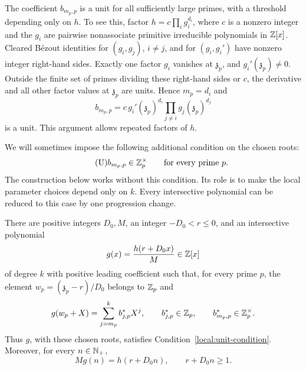 The coefficient \(b_{m_p,p}\) is a unit for all sufficiently large primes,
with a threshold depending only on \(h\). To see this, factor
\(h=c\prod_i g_i^{d_i}\), where \(c\) is a nonzero integer and the \(g_i\)
are pairwise nonassociate primitive irreducible polynomials in \(\mathbb Z[x]\). Cleared
B\'ezout identities for \((g_i,g_j)\), \(i\ne j\), and for \((g_i,g_i')\)
have nonzero integer right-hand sides. Exactly one factor \(g_i\) vanishes
at \(\mathfrak z_p\), and \(g_i'(\mathfrak z_p)\ne0\). Outside the finite
set of primes dividing these right-hand sides or \(c\), the derivative and
all other factor values at \(\mathfrak z_p\) are units. Hence \(m_p=d_i\)
and
\[
 b_{m_p,p}
 =c\,g_i'(\mathfrak z_p)^{d_i}
       \prod_{j\ne i}g_j(\mathfrak z_p)^{d_j}
\]
is a unit. This argument allows repeated factors of \(h\).

We will sometimes impose the following additional condition on the chosen
roots:
\begin{equation*}\tag{U}\label{local:unit-condition}
 b_{m_p,p}\in\mathbb Z_p^\times\qquad\text{for every prime }p.
\end{equation*}
The construction below works without this condition. Its role is to make the
local parameter choices depend only on \(k\). Every intersective polynomial
can be reduced to this case by one progression change.

\begin{lemma}\label{local:normalization}
There are positive integers \(D_0,M\), an integer \(-D_0<r\le0\), and an
intersective polynomial
\[
 g(x)=\frac{h(r+D_0x)}{M}\in\mathbb Z[x]
\]
of degree \(k\) with positive leading coefficient such that, for every prime
\(p\), the element \(w_p=(\mathfrak z_p-r)/D_0\) belongs to \(\mathbb Z_p\) and
\[
 g(w_p+X)=\sum_{j=m_p}^k b^*_{j,p}X^j,
 \qquad b^*_{j,p}\in\mathbb Z_p,
 \qquad b^*_{m_p,p}\in\mathbb Z_p^\times.
\]
Thus \(g\), with these chosen roots, satisfies
Condition~\eqref{local:unit-condition}. Moreover, for every \(n\in\mathbb N_+\),
\[
 Mg(n)=h(r+D_0n),\qquad r+D_0n\ge1.
\]
\end{lemma}

